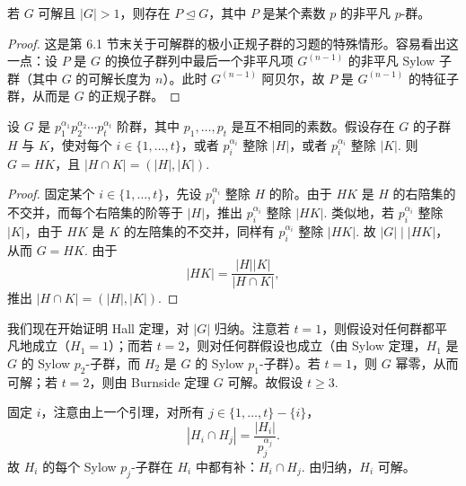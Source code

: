 \begin{lemma}\label{lem:19.9}
若 \(G\) 可解且 \(|G| > 1\)，则存在 \(P \trianglelefteq G\)，其中 \(P\) 是某个素数 \(p\) 的非平凡 \(p\)-群。
\end{lemma}

\begin{proof}
这是第 6.1 节末关于可解群的极小正规子群的习题的特殊情形。容易看出这一点：设 \(P\) 是 \(G\) 的换位子群列中最后一个非平凡项 \(G^{(n-1)}\) 的非平凡 Sylow 子群（其中 \(G\) 的可解长度为 \(n\)）。此时 \(G^{(n-1)}\) 阿贝尔，故 \(P\) 是 \(G^{(n-1)}\) 的特征子群，从而是 \(G\) 的正规子群。
\end{proof}

\begin{lemma}\label{lem:19.10}
设 \(G\) 是 \(p_1^{\alpha_1}p_2^{\alpha_2}\cdots p_t^{\alpha_t}\) 阶群，其中 \(p_1, \ldots, p_t\) 是互不相同的素数。假设存在 \(G\) 的子群 \(H\) 与 \(K\)，使对每个 \(i \in \{1, \ldots, t\}\)，或者 \(p_i^{\alpha_i}\) 整除 \(|H|\)，或者 \(p_i^{\alpha_i}\) 整除 \(|K|\). 则 \(G = HK\)，且 \(|H \cap K| = (|H|, |K|)\).
\end{lemma}

\begin{proof}
固定某个 \(i \in \{1, \ldots, t\}\)，先设 \(p_i^{\alpha_i}\) 整除 \(H\) 的阶。由于 \(HK\) 是 \(H\) 的右陪集的不交并，而每个右陪集的阶等于 \(|H|\)，推出 \(p_i^{\alpha_i}\) 整除 \(|HK|\). 类似地，若 \(p_i^{\alpha_i}\) 整除 \(|K|\)，由于 \(HK\) 是 \(K\) 的左陪集的不交并，同样有 \(p_i^{\alpha_i}\) 整除 \(|HK|\). 故 \(|G| \mid |HK|\)，从而 \(G = HK\). 由于
\[
|HK| = \frac{|H||K|}{|H \cap K|},
\]
推出 \(|H \cap K| = (|H|, |K|)\).
\end{proof}

我们现在开始证明 Hall 定理，对 \(|G|\) 归纳。注意若 \(t = 1\)，则假设对任何群都平凡地成立（\(H_1 = 1\)）；而若 \(t = 2\)，则对任何群假设也成立（由 Sylow 定理，\(H_1\) 是 \(G\) 的 Sylow \(p_2\)-子群，而 \(H_2\) 是 \(G\) 的 Sylow \(p_1\)-子群）。若 \(t = 1\)，则 \(G\) 幂零，从而可解；若 \(t = 2\)，则由 Burnside 定理 \(G\) 可解。故假设 \(t \geq 3\).

固定 \(i\)，注意由上一个引理，对所有 \(j \in \{1, \ldots, t\} - \{i\}\)，
\[
|H_i \cap H_j| = \frac{|H_i|}{p_j^{\alpha_j}}.
\]
故 \(H_i\) 的每个 Sylow \(p_j\)-子群在 \(H_i\) 中都有补：\(H_i \cap H_j\). 由归纳，\(H_i\) 可解。


